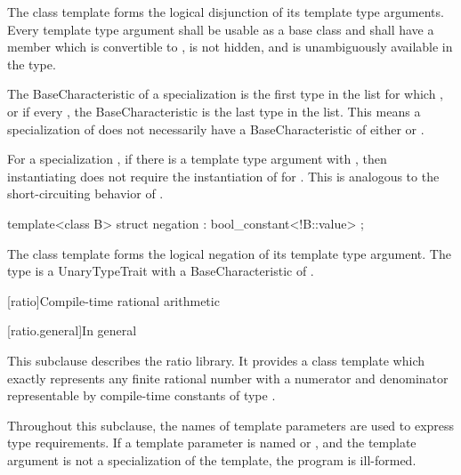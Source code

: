 \begin{itemdescr}
\pnum
The class template 
forms the logical disjunction of its template type arguments.
Every template type argument shall be usable as a base class and
shall have a member  which
is convertible to ,
is not hidden, and
is unambiguously available in the type.

\pnum
The BaseCharacteristic of a specialization 
is the first type  in the list 
for which , or
if every ,
the BaseCharacteristic is the last type in the list.
\enternote This means a specialization of 
does not necessarily have a BaseCharacteristic
of either  or .
\exitnote

\pnum
For a specialization ,
if there is a template type argument  with ,
then instantiating 
does not require the instantiation of  for .
\enternote This is analogous to the short-circuiting behavior of \tcode{||}.
\exitnote
\end{itemdescr}

%
\begin{itemdecl}
template<class B> struct negation : bool_constant<!B::value> { };
\end{itemdecl}

\begin{itemdescr}
\pnum
The class template 
forms the logical negation of its template type argument.
The type 
is a UnaryTypeTrait with a BaseCharacteristic of .
\end{itemdescr}

[ratio]{Compile-time rational arithmetic}

[ratio.general]{In general}

\pnum
{}%
This subclause describes the ratio library. It provides a class template
 which exactly represents any finite rational number with a
numerator and denominator representable by compile-time constants of type
.

\pnum
Throughout this subclause, the names of template parameters are used to express
type requirements. If a template parameter is named  or ,
and the template argument is not a specialization of the  template,
the program is ill-formed.

